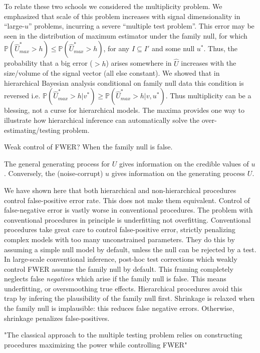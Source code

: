 \documentclass{article}
\begin{document}
To relate these two schools we considered the multiplicity problem. We emphasized that scale of this problem increases with signal dimensionality in ``large-$u$'' problems, incurring a severe ``multiple test problem''. This error may be seen in the distribution of maximum estimator under the family null, for which $\mathbb{P}(\hat{U}_{max}^* > h) \leq \mathbb{P}(\hat{U}_{max}^* > h)$, for any $I \subseteq I'$ and some null $u^*$. Thus, the probability that a big error ($>h$) arises somewhere in $\hat{U}$ increases with the size/volume of the signal vector (all else constant). We showed that in hierarchical Bayesian analysis conditional on family null data this condition is reversed i.e. $\mathbb{P}(\hat{U}_{max}^* > h|v^*) \geq \mathbb{P}(\hat{U}_{max}^* > h|v,u^*)$. Thus multiplicity can be a blessing, not a curse for hierarchical models. The maxima provides one way to illustrate how hierarchical inference can automatically solve the over-estimating/testing problem.

Weak control of FWER? When the family null is false.

The general generating process for $U$ gives information on the credible values of $u$. Conversely, the (noise-corrupt) $u$ gives information on the generating process $U$. 

We have shown here that both hierarchical and non-hierarchical procedures control false-positive error rate. This does not make them equivalent. Control of false-negative error is vastly worse in conventional procedures. The problem with conventional procedures in principle is underfitting not overfitting. Conventional procedures take great care to control false-positive error, strictly penalizing complex models with too many unconstrained parameters. They do this by assuming a simple null model by default, unless the null can be rejected by a test. In large-scale conventional inference, post-hoc test corrections which weakly control FWER assume the family null by default. This framing completely neglects false \textit{negatives} which arise if the family null is false. This means underfitting, or oversmoothing true effects. Hierarchical procedures avoid this trap by infering the plausibility of the family null first. Shrinkage is relaxed when the family null is implausible: this reduces false negative errors. Otherwise, shrinkage penalizes false-positives.


"The classical approach to the multiple testing problem relies on constructing procedures maximizing the power while controlling FWER"
\end{document}
